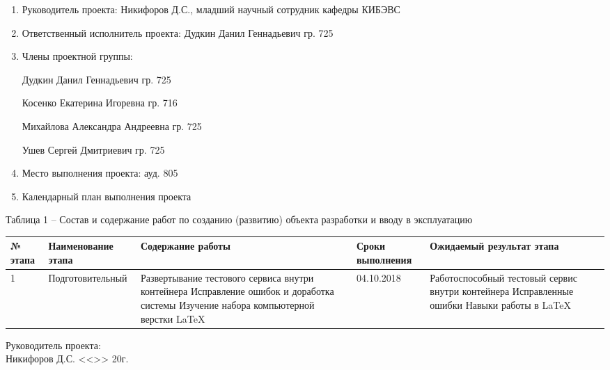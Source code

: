 \begin{enumerate}
\item Руководитель проекта:  Никифоров Д.С., младший научный сотрудник кафедры КИБЭВС\par
\item Ответственный исполнитель проекта: Дудкин Данил Геннадьевич гр. 725\par
\item Члены проектной группы:\par
\hspace{2cm}Дудкин Данил Геннадьевич гр. 725\par
\hspace{2cm}Косенко Екатерина Игоревна гр. 716\par
\hspace{2cm}Михайлова Александра Андреевна гр. 725\par
\hspace{2cm}Ушев Сергей Дмитриевич гр. 725\par
\item Место выполнения проекта: ауд. 805\par
\item Календарный план выполнения проекта\par
\end{enumerate}
	
\vspace{\baselineskip}

\noindent Таблица 1 -- Состав и содержание работ по созданию (развитию) объекта разработки и вводу в эксплуатацию\\

\begin{tabular}{|p{0.5cm}|p{2cm}|p{3cm}|p{3cm}|p{6cm}|}
\hline № этапа & Наименование этапа & Содержание работы & Сроки выполнения & Ожидаемый результат этапа\\ \hline 
1 & Подготовительный & Развертывание тестового сервиса внутри контейнера Исправление ошибок и доработка системы Изучение набора компьютерной верстки \LaTeX & 04.10.2018 & Работоспособный тестовый сервис внутри контейнера Исправленные ошибки Навыки работы в \LaTeX\\
\hline

\end{tabular}

\vspace{\baselineskip}

\begin{flushleft}
\begin{minipage}{0.45\textwidth}
 \begin{flushleft}
Руководитель проекта:\\
\underline{\hspace{1.5cm}} Никифоров Д.С.
<<\underline{\hspace{1cm}}>>\underline{\hspace{3cm}} 20\underline{\hspace{0.5cm}}г.\\
 \end{flushleft}
 \end{minipage}
\end{flushleft}

